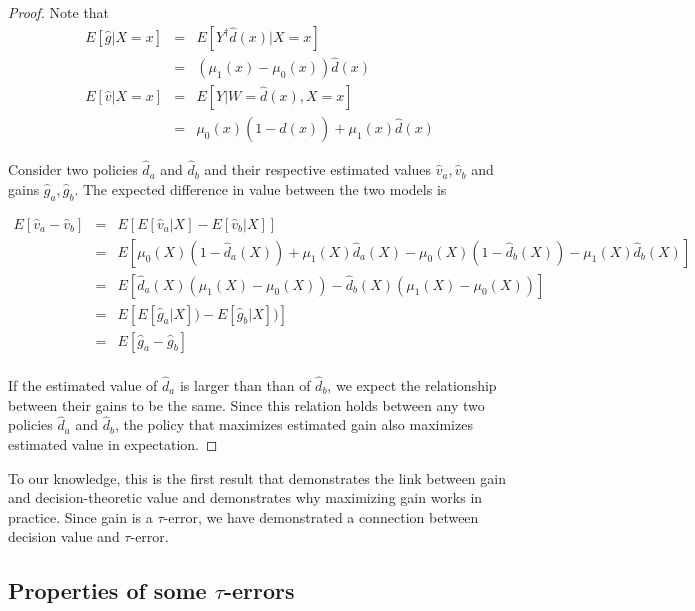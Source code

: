 \begin{proof}
Note that
\[
\begin{array}{rcl}	
	E[\hat g | X=x] & = & E[Y^{\dagger} \hat d(x) | X=x]  \\
	& =  & (\mu_1(x)-\mu_0(x))  \hat d(x)  \\
	E[\hat v | X=x] & = & E[Y | W=\hat d(x), X=x]  \\
	& = & \mu_0(x)(1-\hat d(x)) + \mu_1(x)\hat d(x)
\end{array}
\]

Consider two policies $\hat d_a$ and $\hat d_b$ and their respective estimated values $\hat v_a, \hat v_b$  and gains $\hat g_a, \hat g_b$. The expected difference in value between the two models is 

\[
\begin{array}{rcl}
E[\hat v_a - \hat v_b] 

& = & E[E[\hat v_a | X] - E[\hat v_b|X]] \\

&=& E \left[
	\mu_0(X)(1-\hat d_a(X)) + \mu_1(X)\hat d_a(X) 
      - \mu_0(X)(1-\hat d_b(X)) -  \mu_1(X)\hat d_b(X)
\right] \\

&=& E \left[
	  \hat d_a(X) (\mu_1(X)  - \mu_0(X) ) 
	- \hat d_b(X) (\mu_1(X)  - \mu_0(X) )
\right] \\

&=& E \left[
	  E[\hat g_a | X] ) 
	- E[\hat g_b | X] )
\right] \\

&=& E \left[ \hat g_a - \hat g_b \right] \\

\end{array}
\]

If the estimated value of $\hat d_a$ is larger than than of $\hat d_b$, we expect the relationship between their gains to be the same. Since this relation holds between any two policies $\hat d_a$ and $\hat d_b$, the policy that maximizes estimated gain also maximizes estimated value in expectation.

\end{proof}

To our knowledge, this is the first result that demonstrates the link between gain and decision-theoretic value and demonstrates why maximizing gain works in practice. Since gain is a $\tau$-error, we have demonstrated a connection between decision value and $\tau$-error. 

\subsection{Properties of some $\tau$-errors}


